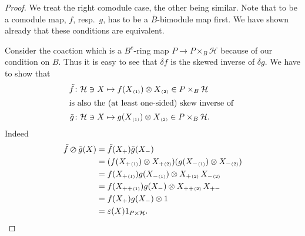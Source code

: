 \documentclass[a4paper,reqno]{amsart}
\numberwithin{equation}{section}
\theoremstyle{plain}
\theoremstyle{remark}
\numberwithin{equation}{section}
\newcommand{\ot}{\otimes}
\newcommand{\BB}{\overline{B}}
\renewcommand{\o}{{}_{\scriptscriptstyle{(1)}}}
\renewcommand{\t}{{}_{\scriptscriptstyle{(2)}}}
\newcommand{\CH}{\mathcal{H}}
\newcommand\skpr{\varoslash}
\begin{document}
\begin{proof}
    We treat the right comodule case, the other being similar.  Note that to be a comodule map, $f$, resp.\ $g$, has to be a $\BB$-bimodule map first. We have shown already that these conditions are equivalent. 

    Consider the coaction which is a $B^e$-ring map $P\to P\times_B \CH$ because of our condition on $B$. Thus it is easy to see that $\delta f$ is the skewed inverse of $\delta g$. We have to show that
    \begin{align*}
        \tilde f\colon \CH\ni X&\mapsto f(X\o)\ot X\t\in P\times_B \CH\\\intertext{is also the (at least one-sided) skew inverse of }
        \tilde g\colon \CH\ni X&\mapsto g(X\o)\ot X\t\in P\times_B \CH.
    \end{align*}
    Indeed
    \begin{align*}
        \tilde f\skpr\tilde g(X)&=\tilde f(X_+)\tilde g(X_-)\\
        &=(f(X_+\o)\ot X_+\t)(g(X_{-}\o)\ot X_{-}\t)\\
        &=f(X_+\o)g(X_{-}\o)\ot X_+\t\, X_{-}\t\\
        &=f(X_{++}\o)g(X_{-})\ot X_{++}\t\, X_{+-}\\
         &=f(X_{+})g(X_{-})\ot 1\\
        &=\varepsilon(X)1_{P\times \CH}.
    \end{align*}
\end{proof}
\end{document}
